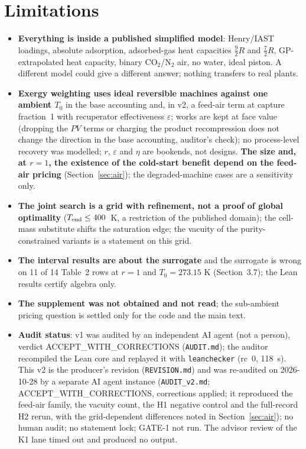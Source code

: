 \documentclass[10pt]{article}
\begin{document}
\section{Limitations}\label{sec:lim}
\begin{itemize}\itemsep=1pt
\item \textbf{Everything is inside a published simplified model}: Henry/IAST loadings, absolute adsorption, adsorbed-gas heat capacities $\tfrac92R$ and $\tfrac72R$, GP-extrapolated heat capacity, binary CO$_2$/N$_2$ air, no water, ideal piston. A different model could give a different answer; nothing transfers to real plants.
\item \textbf{Exergy weighting uses ideal reversible machines against one ambient $T_0$} in the base accounting and, in v2, a feed-air term at capture fraction~1 with recuperator effectiveness $\varepsilon$; works are kept at face value (dropping the $PV$ terms or charging the product recompression does not change the direction in the base accounting, auditor's check); no process-level recovery was modelled; $r$, $\varepsilon$ and $\eta$ are bookends, not designs. \textbf{The size and, at $r=1$, the existence of the cold-start benefit depend on the feed-air pricing} (Section~\ref{sec:air}); the degraded-machine cases are a sensitivity only.
\item \textbf{The joint search is a grid with refinement, not a proof of global optimality} ($T_{\rm end}\le400$~K, a restriction of the published domain); the cell-mass substitute shifts the saturation edge; the vacuity of the purity-constrained variants is a statement on this grid.
\item \textbf{The interval results are about the surrogate} and the surrogate is wrong on 11 of 14 Table~2 rows at $r=1$ and $T_0=273.15$ K (Section~3.7); the Lean results certify algebra only.
\item \textbf{The supplement was not obtained and not read}; the sub-ambient pricing question is settled only for the code and the main text.
\item \textbf{Audit status}: v1 was audited by an independent AI agent (not a person), verdict ACCEPT\_WITH\_CORRECTIONS (\texttt{AUDIT.md}); the auditor recompiled the Lean core and replayed it with \texttt{leanchecker} (rc~0, 118~s). This v2 is the producer's revision (\texttt{REVISION.md}) and was re-audited on 2026-10-28 by a separate AI agent instance (\texttt{AUDIT\_v2.md}; ACCEPT\_WITH\_CORRECTIONS, corrections applied; it reproduced the feed-air family, the vacuity count, the H1 negative control and the full-record H2 rerun, with the grid-dependent differences noted in Section~\ref{sec:air}); no human audit; no statement lock; GATE-1 not run. The advisor review of the K1 lane timed out and produced no output.

\end{itemize}
\end{document}
